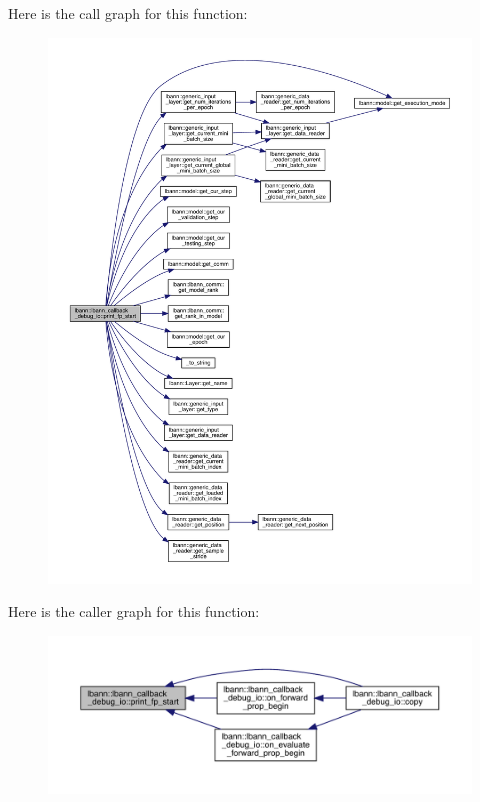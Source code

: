 Here is the call graph for this function\+:\nopagebreak
\begin{figure}[H]
\begin{center}
\leavevmode
\includegraphics[width=350pt]{classlbann_1_1lbann__callback__debug__io_a3c9897a583441381f82a11246aea4424_cgraph}
\end{center}
\end{figure}
Here is the caller graph for this function\+:\nopagebreak
\begin{figure}[H]
\begin{center}
\leavevmode
\includegraphics[width=350pt]{classlbann_1_1lbann__callback__debug__io_a3c9897a583441381f82a11246aea4424_icgraph}
\end{center}
\end{figure}
\mbox{\label{classlbann_1_1lbann__callback__debug__io_a528f4aea5f657f40b27c58a164d4095a}} 
